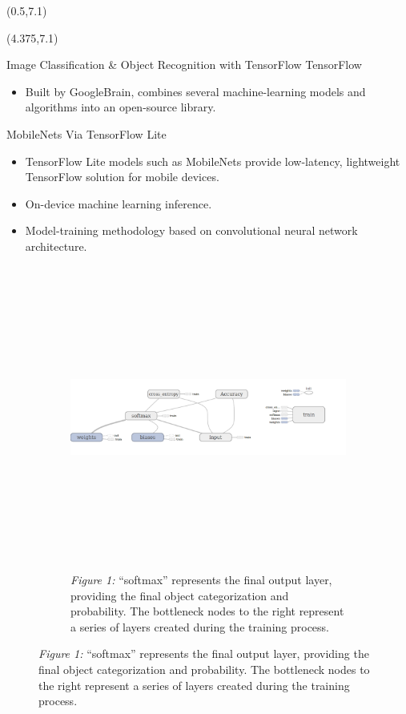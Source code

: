 \documentclass[22pt]{beamer}
\begin{document}
\begin{frame}[fragile]
\begin{textblock}{3.5}
\end{textblock}

\begin{textblock}{7.25}(0.5,7.1)



\end{textblock}



\begin{textblock}{7.25}(4.375,7.1)
\begin{block}{Image Classification & Object Recognition with TensorFlow}
TensorFlow
\begin{itemize}
\item Built by GoogleBrain, combines several machine-learning models and algorithms into an open-source library.
\end{itemize}
MobileNets Via TensorFlow Lite
\begin{itemize}
\item TensorFlow Lite models such as MobileNets provide low-latency, lightweight TensorFlow solution for mobile devices.
\item On-device machine learning inference.
\item Model-training methodology based on convolutional neural network architecture.
\end{itemize}
\begin{figure}[htbp] %
\begin{subfigure}{0.95\textwidth}
   \centering
   \includegraphics[height=10cm]{softmax.png}
   \caption*{\textit{Figure 1:} “softmax” represents the final output layer, providing the final object categorization and probability. The bottleneck nodes to the right represent a series of layers created during the training process.}

\end{subfigure}
\end{figure}
\end{block}
\end{textblock}
\end{frame}
\end{document}

